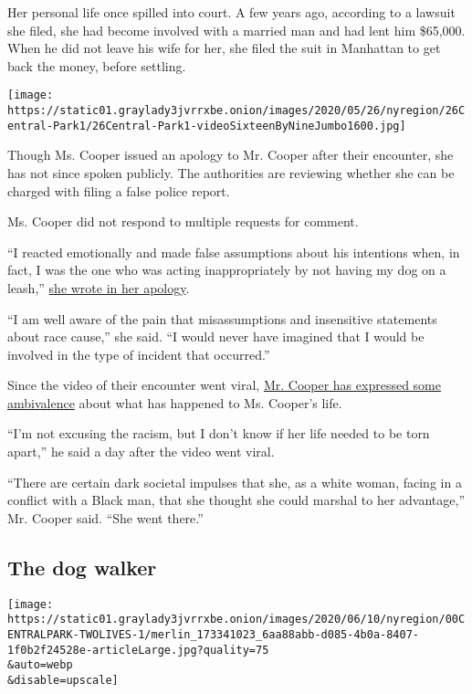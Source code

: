 Her personal life once spilled into court. A few years ago, according to
a lawsuit she filed, she had become involved with a married man and had
lent him \$65,000. When he did not leave his wife for her, she filed the
suit in Manhattan to get back the money, before settling.

\texttt{[image: https://static01.graylady3jvrrxbe.onion/images/2020/05/26/nyregion/26Central-Park1/26Central-Park1-videoSixteenByNineJumbo1600.jpg]}

Though Ms. Cooper issued an apology to Mr. Cooper after their encounter,
she has not since spoken publicly. The authorities are reviewing whether
she can be charged with filing a false police report.

Ms. Cooper did not respond to multiple requests for comment.

``I reacted emotionally and made false assumptions about his intentions
when, in fact, I was the one who was acting inappropriately by not
having my dog on a leash,''
\href{https://www.prnewswire.com/news-releases/statement-from-amy-cooper-on-central-park-incident-301065492.html}{she
wrote in her apology}.

``I am well aware of the pain that misassumptions and insensitive
statements about race cause,'' she said. ``I would never have imagined
that I would be involved in the type of incident that occurred.''

Since the video of their encounter went viral,
\href{https://www.nytimes3xbfgragh.onion/2020/05/27/nyregion/amy-cooper-christian-central-park-video.html}{Mr.
Cooper has expressed some ambivalence} about what has happened to Ms.
Cooper's life.

``I'm not excusing the racism, but I don't know if her life needed to be
torn apart,'' he said a day after the video went viral.

``There are certain dark societal impulses that she, as a white woman,
facing in a conflict with a Black man, that she thought she could
marshal to her advantage,'' Mr. Cooper said. ``She went there.''

\hypertarget{the-dog-walker}{%
\subsection{The dog walker}\label{the-dog-walker}}

\texttt{[image: https://static01.graylady3jvrrxbe.onion/images/2020/06/10/nyregion/00CENTRALPARK-TWOLIVES-1/merlin\_173341023\_6aa88abb-d085-4b0a-8407-1f0b2f24528e-articleLarge.jpg?quality=75\\\&auto=webp\\\&disable=upscale]}

